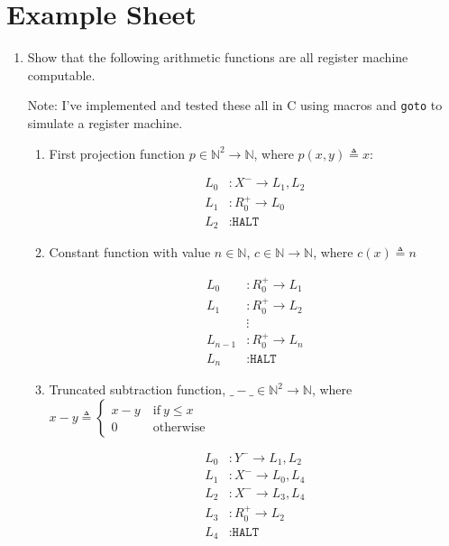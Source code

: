 \documentclass[10pt,\jkfside,a4paper]{article}
\begin{document}
\section{Example Sheet}

\begin{enumerate}

\item Show that the following arithmetic functions
are all register machine computable.

Note: I've implemented and tested these all in C using macros and
\texttt{goto} to simulate a register machine.

\begin{enumerate}[label=(\alph*)]

\item First projection function $p \in \mathbb{N}^2 \to \mathbb{N}$, where
$p(x, y) \triangleq x$:

\begin{align*}
L_0&: X^- \to L_{1}, L_2 \\
L_1&: R_0^+ \to L_0 \\
L_2&: \texttt{HALT}
\end{align*}

\item Constant function with value $n \in \mathbb{N}$, $c \in \mathbb{N} \to
\mathbb{N}$, where $c(x) \triangleq n$

\begin{align*}
L_0&: R_0^+ \to L_1 \\
L_1&: R_0^+ \to L_2 \\
&\vdots \\
L_{n-1}&: R_0^+ \to L_n \\
L_n&: \texttt{HALT}
\end{align*}

\item Truncated subtraction function, $\_ - \_ \in \mathbb{N}^2 \to
\mathbb{N}$, where $x - y \triangleq \begin{cases} x - y &
\ \text{if} \ y \leq x \\ 0 & \ \text{otherwise}\end{cases}$

\begin{align*}
L_0 &: Y^- \to L_1, L_2 \\
L_1 &: X^- \to L_0, L_4 \\
L_2 &: X^- \to L_3, L_4 \\
L_3 &: R_0^+ \to L_2 \\
L_4 &: \texttt{HALT}
\end{align*}


\end{enumerate}
\end{enumerate}
\end{document}

